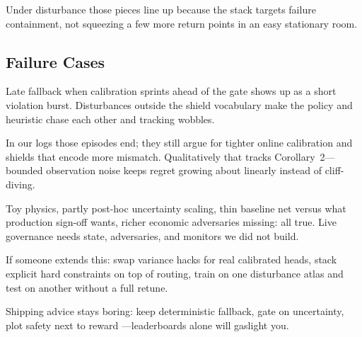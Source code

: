 Under disturbance those pieces line up because the stack targets failure containment, not squeezing a few more return points in an easy stationary room.

\subsection{Failure Cases}

Late fallback when calibration sprints ahead of the gate shows up as a short violation burst. Disturbances outside the shield vocabulary make the policy and heuristic chase each other and tracking wobbles.

In our logs those episodes end; they still argue for tighter online calibration and shields that encode more mismatch. Qualitatively that tracks Corollary~2---bounded observation noise keeps regret growing about linearly instead of cliff-diving.

Toy physics, partly post-hoc uncertainty scaling, thin baseline net versus what production sign-off wants, richer economic adversaries missing: all true. Live governance needs state, adversaries, and monitors we did not build.

If someone extends this: swap variance hacks for real calibrated heads, stack explicit hard constraints on top of routing, train on one disturbance atlas and test on another without a full retune.

Shipping advice stays boring: keep deterministic fallback, gate on uncertainty, plot safety next to reward \cite{pineau2021improving,dror2018hitchhikers}---leaderboards alone will gaslight you.

\begin{table}[htbp]
\centering

\caption{Heuristic on when this pattern is worth the complexity.}
\label{tab:when-to-use}
\end{table}
